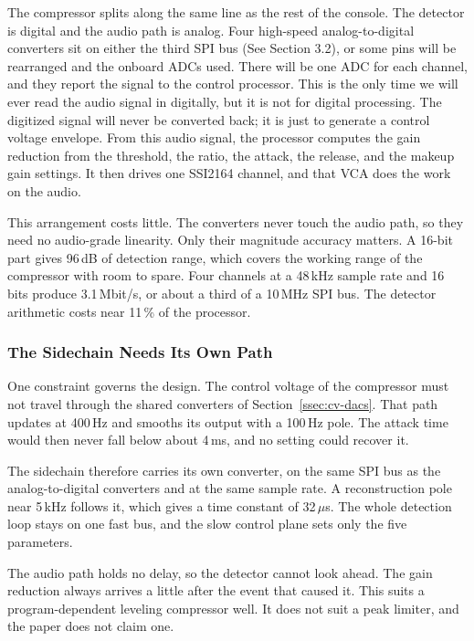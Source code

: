 \documentclass[11pt, letterpaper,titlepage]{article}
\begin{document}
The compressor splits along the same line as the rest of the console. The
detector is digital and the audio path is analog. Four high-speed
analog-to-digital converters sit on either the third SPI bus (See Section 3.2), or some pins will be rearranged and the onboard ADCs used. There will be one ADC for each channel, and
they report the signal to the control processor. This is the only time we will ever read the audio signal in digitally, but it is not for digital processing. The digitized signal will never be converted back; it is just to generate a control voltage envelope. From this audio signal, the processor computes the
gain reduction from the threshold, the ratio, the attack, the release, and the
makeup gain settings. It then drives one SSI2164 channel, and that VCA does the work on
the audio.

This arrangement costs little. The converters never touch the audio path, so
they need no audio-grade linearity. Only their magnitude accuracy matters. A
16-bit part gives 96\,dB of detection range, which covers the working range of
the compressor with room to spare. Four channels at a 48\,kHz sample rate and 16
bits produce 3.1\,Mbit/s, or about a third of a 10\,MHz SPI bus. The detector
arithmetic costs near 11\,\% of the processor.

\subsubsection*{The Sidechain Needs Its Own Path}
\label{sssec:comp-latency}

One constraint governs the design. The control voltage of the compressor must
not travel through the shared converters of Section~\ref{ssec:cv-dacs}. That
path updates at 400\,Hz and smooths its output with a 100\,Hz pole. The attack
time would then never fall below about 4\,ms, and no setting could recover it.

The sidechain therefore carries its own converter, on the same SPI bus as the
analog-to-digital converters and at the same sample rate. A reconstruction pole
near 5\,kHz follows it, which gives a time constant of 32\,$\mu$s. The whole
detection loop stays on one fast bus, and the slow control plane sets only the
five parameters.

The audio path holds no delay, so the detector cannot look ahead. The gain
reduction always arrives a little after the event that caused it. This suits a
program-dependent leveling compressor well. It does not suit a peak limiter, and
the paper does not claim one.
\end{document}

